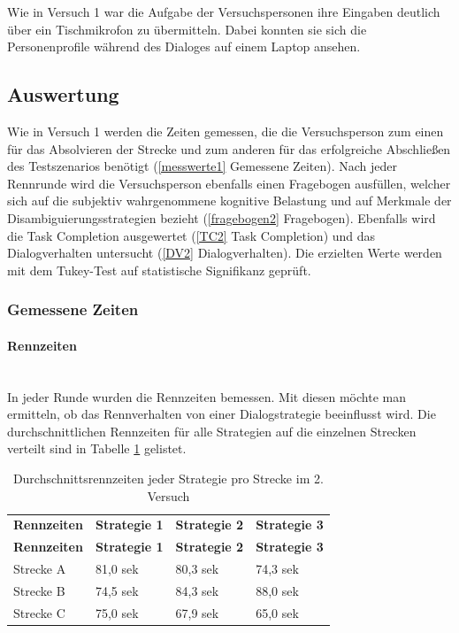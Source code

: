 \documentclass[12pt,a4paper]{scrartcl}
\begin{document}
Wie in Versuch 1 war die Aufgabe der Versuchspersonen ihre Eingaben deutlich über ein Tischmikrofon zu übermitteln. Dabei konnten sie sich die Personenprofile während des Dialoges auf einem Laptop ansehen.



\subsection{Auswertung}
\label{auswertung2}
Wie in Versuch 1 werden die Zeiten gemessen, die die Versuchsperson zum einen für das Absolvieren der Strecke und zum anderen für das erfolgreiche Abschließen des Testszenarios benötigt (\ref{messwerte1} Gemessene Zeiten).
Nach jeder Rennrunde wird die Versuchsperson ebenfalls einen Fragebogen ausfüllen, welcher sich auf die subjektiv wahrgenommene kognitive Belastung und auf Merkmale der Disambiguierungsstrategien bezieht (\ref{fragebogen2} Fragebogen). Ebenfalls wird die Task Completion ausgewertet (\ref{TC2} Task Completion) und das Dialogverhalten untersucht (\ref{DV2} Dialogverhalten). Die erzielten Werte werden mit dem Tukey-Test
auf statistische Signifikanz geprüft. 
\subsubsection{Gemessene Zeiten}
\label{messwerte}
\paragraph{Rennzeiten} 
~\\
In jeder Runde wurden die Rennzeiten bemessen. Mit diesen möchte man ermitteln, ob das Rennverhalten von einer Dialogstrategie beeinflusst wird. 
Die durchschnittlichen Rennzeiten für alle Strategien auf die einzelnen Strecken verteilt sind in Tabelle \ref{RZ3SV2} gelistet. 
\begin{longtable}{p{3cm}p{3cm}p{3cm}p{3cm} }
	\label{RZ3SV2}\\
	\caption[Durchschnittsrennzeiten jeder Strategie pro Strecke im 2. Versuch]{Durchschnittsrennzeiten jeder Strategie pro Strecke im 2. Versuch}\\
	\hline
	\textbf{Rennzeiten}&\textbf{Strategie 1}&\textbf{Strategie 2} &\textbf{Strategie 3}\\
	\hline
	\endfirsthead
	\hline
	\textbf{Rennzeiten}&\textbf{Strategie 1}&\textbf{Strategie 2} &\textbf{Strategie 3}\\
	\hline
	\endhead
Strecke A & 81,0 sek & 80,3 sek & 74,3 sek \\
Strecke B & 74,5 sek & 84,3 sek & 88,0 sek \\
Strecke C & 75,0 sek & 67,9 sek & 65,0 sek \\
\hline
\end{longtable}
\end{document}
